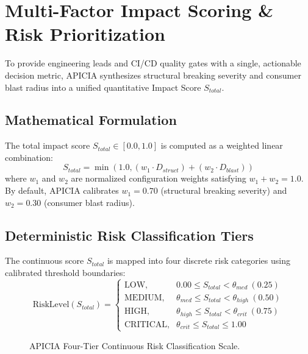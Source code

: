 \documentclass[conference]{IEEEtran}
\begin{document}
\section{Multi-Factor Impact Scoring \& Risk Prioritization}
\label{sec:scoring}

To provide engineering leads and CI/CD quality gates with a single, actionable decision metric, APICIA synthesizes structural breaking severity and consumer blast radius into a unified quantitative Impact Score $S_{total}$.

\subsection{Mathematical Formulation}
The total impact score $S_{total} \in [0.0, 1.0]$ is computed as a weighted linear combination:
\begin{equation}
S_{total} = \min\left(1.0, (w_1 \cdot D_{struct}) + (w_2 \cdot D_{blast})\right)
\label{eq:s_total}
\end{equation}
where $w_1$ and $w_2$ are normalized configuration weights satisfying $w_1 + w_2 = 1.0$. By default, APICIA calibrates $w_1 = 0.70$ (structural breaking severity) and $w_2 = 0.30$ (consumer blast radius).

\subsection{Deterministic Risk Classification Tiers}
The continuous score $S_{total}$ is mapped into four discrete risk categories using calibrated threshold boundaries:
\begin{equation}
\text{RiskLevel}(S_{total}) = \begin{cases}
\text{LOW}, & 0.00 \le S_{total} < \theta_{med} \ (0.25) \\
\text{MEDIUM}, & \theta_{med} \le S_{total} < \theta_{high} \ (0.50) \\
\text{HIGH}, & \theta_{high} \le S_{total} < \theta_{crit} \ (0.75) \\
\text{CRITICAL}, & \theta_{crit} \le S_{total} \le 1.00
\end{cases}
\end{equation}

\begin{figure}[h]
\centering
{}
\caption{APICIA Four-Tier Continuous Risk Classification Scale.}
\label{fig:risk_scale}
\end{figure}
\end{document}
